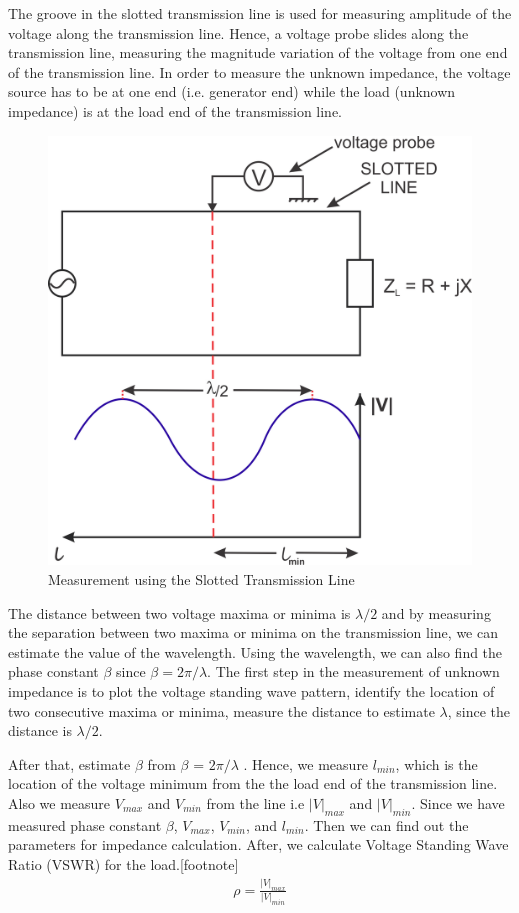 The groove in the slotted transmission line is used for measuring amplitude of the voltage along the transmission line. Hence, a voltage probe slides along the transmission line, measuring the magnitude variation of the voltage from one end of the transmission line. In order to measure the unknown impedance, the voltage source has to be at one end (i.e. generator end) while the load (unknown impedance) is at the load end of the transmission line.
\begin{figure}[h]
\centering
\includegraphics[width=1\linewidth]{./graphics/group10diagram1}
\caption{Measurement using the Slotted Transmission Line}
\end{figure}

The distance between two voltage maxima or minima is $\lambda/2$ and by measuring the separation between two maxima or minima on the transmission line, we can estimate the value of the wavelength. Using the wavelength, we can also find the phase constant $\beta$ since $\beta = 2\pi/\lambda$. The first step in the measurement of unknown impedance is to plot the voltage standing wave pattern, identify the location of two consecutive maxima or minima, measure the distance to estimate $\lambda$, since the distance is $\lambda/2$.

After that, estimate $\beta$ from $\beta$ = $2\pi/\lambda$ . Hence, we measure $l_{min}$, which is the location of the voltage minimum from the the load end of the transmission line. Also we measure $V_{max}$ and $V_{min}$ from the line i.e $|V|_{max}$ and $|V|_{min}$. Since we have measured phase constant $\beta$, $V_{max}$, $V_{min}$, and $l_{min}$. Then we can find out the parameters for impedance calculation. After, we calculate Voltage Standing Wave Ratio (VSWR) for the load.[footnote]
\begin{align}
\rho = \frac{|V|_{max}}{|V|_{min}}
\end{align}

